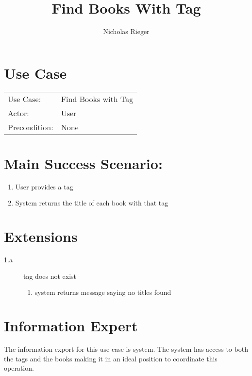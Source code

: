 \documentclass{article}
\title{Find Books With Tag}
\author{Nicholas Rieger}
\begin{document}
\maketitle

\section*{Use Case}
\begin{tabular}{l l}
 
Use Case:     & Find Books with Tag \\
Actor:        & User                \\
Precondition: & None                \\
\end{tabular}

\section*{Main Success Scenario:}
\begin{enumerate}
    \item User provides a tag
    \item System returns the title of each book with that tag
\end{enumerate}

\section*{Extensions}
\begin{description}
    \item[1.a] tag does not exist
    \begin{enumerate}
        \item system returns message saying no titles found
    \end{enumerate}
\end{description}

\section*{Information Expert}
The information export for this use case is system. The system has access to both the tags and the books making it in an ideal position to coordinate this operation. 
\end{document}
